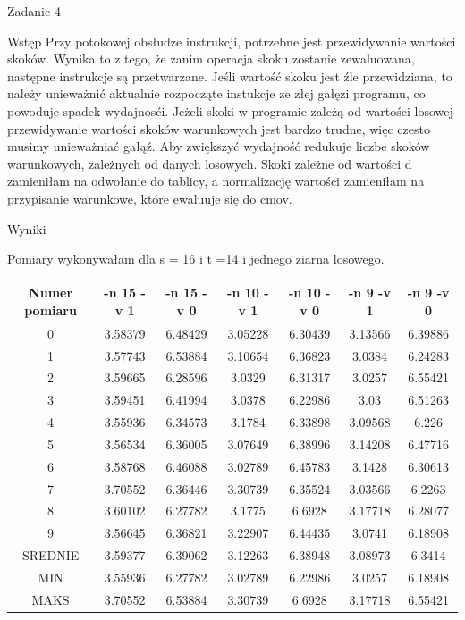 \documentclass[11pt,wide]{mwart}
\begin{document}
 \begin{section}{Zadanie 4}
 
 \begin{subsection}{Wstęp}
 Przy potokowej obsłudze instrukcji, potrzebne jest przewidywanie wartości skoków. Wynika to z tego, że zanim operacja skoku zostanie zewaluowana, następne instrukcje są przetwarzane. Jeśli wartość skoku jest źle przewidziana, to należy unieważnić aktualnie rozpocząte instukcje ze złej gałęzi programu, co powoduje spadek wydajnosći. Jeżeli skoki w programie zależą od wartości losowej przewidywanie wartości skoków warunkowych jest bardzo trudne, więc czesto musimy unieważniać gałąź. 
 Aby zwiększyć wydajność redukuje liczbe skoków warunkowych, zależnych od danych losowych. Skoki zależne od wartości d zamieniłam na odwołanie do tablicy, a normalizację wartości zamieniłam na przypisanie warunkowe, które ewaluuje się do cmov.
 \end{subsection}
 
\begin{subsection}{Wyniki}

Pomiary wykonywałam dla s = 16 i t =14 i jednego ziarna losowego. 
 
\begin{center}
\begin{tabular}{|c|c|c|c|c|c|c|}
\hline
Numer pomiaru &  -n 15 -v 1 & -n 15 -v 0 & -n 10 -v 1 & -n 10 -v 0 & -n 9 -v 1 & -n 9 -v 0 \\
\hline
0 & 3.58379 & 6.48429 & 3.05228 & 6.30439 & 3.13566 & 6.39886\\
\hline
1 & 3.57743 & 6.53884 & 3.10654 & 6.36823 & 3.0384 & 6.24283\\
\hline
2 & 3.59665 & 6.28596 & 3.0329 & 6.31317 & 3.0257 & 6.55421\\
\hline
3 & 3.59451 & 6.41994 & 3.0378 & 6.22986 & 3.03 & 6.51263\\
\hline
4 & 3.55936 & 6.34573 & 3.1784 & 6.33898 & 3.09568 & 6.226\\
\hline
5 & 3.56534 & 6.36005 & 3.07649 & 6.38996 & 3.14208 & 6.47716\\
\hline
6 & 3.58768 & 6.46088 & 3.02789 & 6.45783 & 3.1428 & 6.30613\\
\hline
7 & 3.70552 & 6.36446 & 3.30739 & 6.35524 & 3.03566 & 6.2263\\
\hline
8 & 3.60102 & 6.27782 & 3.1775 & 6.6928 & 3.17718 & 6.28077\\
\hline
9 & 3.56645 & 6.36821 & 3.22907 & 6.44435 & 3.0741 & 6.18908\\
\hline
SREDNIE & 3.59377 & 6.39062 & 3.12263 & 6.38948 & 3.08973 & 6.3414\\
\hline
MIN & 3.55936 & 6.27782 & 3.02789 & 6.22986 & 3.0257 & 6.18908\\
\hline
MAKS & 3.70552 & 6.53884 & 3.30739 & 6.6928 & 3.17718 & 6.55421\\
\hline
\end{tabular}
\end{center}



\end{subsection}
\end{section}
\end{document}
